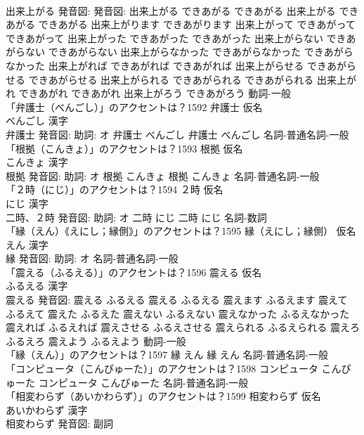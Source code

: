 \documentclass[8pt]{extreport}
\begin{document}
\begin{CJK}{UTF8}{min}
\\	出来上がる 発音図: 発音図:	出来上がる できあがる できあがる		出来上がる できあがる できあがる 出来上がります できあがります 出来上がって できあがって できあがって 出来上がった できあがった できあがった 出来上がらない できあがらない できあがらない 出来上がらなかった できあがらなかった できあがらなかった 出来上がれば できあがれば できあがれば 出来上がらせる できあがらせる できあがらせる 出来上がられる できあがられる できあがられる 出来上がれ できあがれ できあがれ 出来上がろう できあがろう				動詞-一般 
\\	「弁護士（べんごし）」のアクセントは？1592	弁護士 仮名　
\\	べんごし 漢字　
\\	弁護士 発音図: 助詞: オ	弁護士 べんごし		弁護士 べんごし				名詞-普通名詞-一般 
\\	「根拠（こんきょ）」のアクセントは？1593	根拠 仮名　
\\	こんきょ 漢字　
\\	根拠 発音図: 助詞: オ	根拠 こんきょ		根拠 こんきょ				名詞-普通名詞-一般 
\\	「２時（にじ）」のアクセントは？1594	２時 仮名　
\\	にじ 漢字　
\\	二時、２時 発音図: 助詞: オ	二時 にじ		二時 にじ				名詞-数詞 
\\	「縁（えん）《えにし；縁側》」のアクセントは？1595	縁（えにし；縁側） 仮名　
\\	えん 漢字　
\\	縁 発音図: 助詞: オ							名詞-普通名詞-一般 
\\	「震える（ふるえる）」のアクセントは？1596	震える 仮名　
\\	ふるえる 漢字　
\\	震える 発音図:	震える ふるえる		震える ふるえる 震えます ふるえます 震えて ふるえて 震えた ふるえた 震えない ふるえない 震えなかった ふるえなかった 震えれば ふるえれば 震えさせる ふるえさせる 震えられる ふるえられる 震えろ ふるえろ 震えよう ふるえよう				動詞-一般 
\\	「縁（えん）」のアクセントは？1597		縁 えん		縁 えん				名詞-普通名詞-一般 
\\	「コンピュータ（こんぴゅーた）」のアクセントは？1598		コンピュータ こんぴゅーた		コンピュータ こんぴゅーた				名詞-普通名詞-一般 
\\	「相変わらず（あいかわらず）」のアクセントは？1599	相変わらず 仮名　
\\	あいかわらず 漢字　
\\	相変わらず 発音図:							副詞 

\end{CJK}
\end{document}
